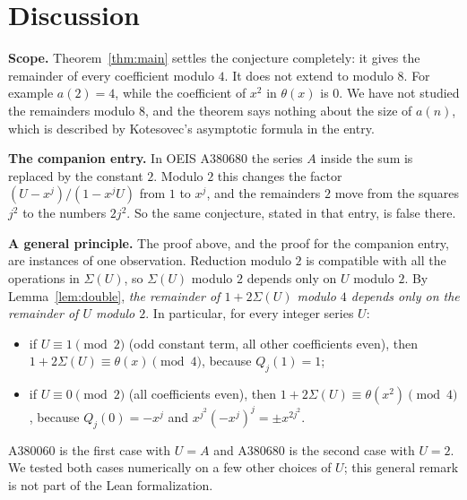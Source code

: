 \documentclass[11pt,a4paper]{article}
\theoremstyle{definition}
\theoremstyle{remark}
\newcommand{\para}[1]{\par\medskip\noindent\textbf{#1}\enspace}
\begin{document}
\section{Discussion}\label{sec:discussion}

\para{Scope.} Theorem~\ref{thm:main} settles the conjecture completely: it gives the remainder of every coefficient
modulo $4$. It does not extend to modulo $8$. For example $a(2)=4$, while the coefficient of $x^2$ in $\theta(x)$ is
$0$. We have not studied the remainders modulo $8$, and the theorem says nothing about the size of $a(n)$, which is
described by Kotesovec's asymptotic formula in the entry.

\para{The companion entry.} In OEIS A380680 the series $A$ inside the sum is replaced by the constant $2$. Modulo $2$
this changes the factor $(U-x^j)/(1-x^jU)$ from $1$ to $x^j$, and the remainders $2$ move from the squares $j^2$ to the
numbers $2j^2$. So the same conjecture, stated in that entry, is false there.

\para{A general principle.} The proof above, and the proof for the companion entry, are instances of one
observation. Reduction modulo $2$ is compatible with
all the operations in $\Sigma(U)$, so $\Sigma(U)$ modulo $2$ depends only on $U$ modulo $2$. By
Lemma~\ref{lem:double}, \emph{the remainder of $1+2\Sigma(U)$ modulo $4$ depends only on the remainder of $U$ modulo
$2$}. In particular, for every integer series $U$:
\begin{itemize}
\item if $U\equiv1\pmod2$ (odd constant term, all other coefficients even), then $1+2\Sigma(U)\equiv\theta(x)\pmod4$,
because $Q_j(1)=1$;
\item if $U\equiv0\pmod2$ (all coefficients even), then $1+2\Sigma(U)\equiv\theta(x^2)\pmod4$, because
$Q_j(0)=-x^j$ and $x^{j^2}(-x^j)^j=\pm x^{2j^2}$.
\end{itemize}
A380060 is the first case with $U=A$ and A380680 is the second case with $U=2$. We tested both cases numerically on
a few other choices of $U$; this general remark is not part of the Lean formalization.
\end{document}
